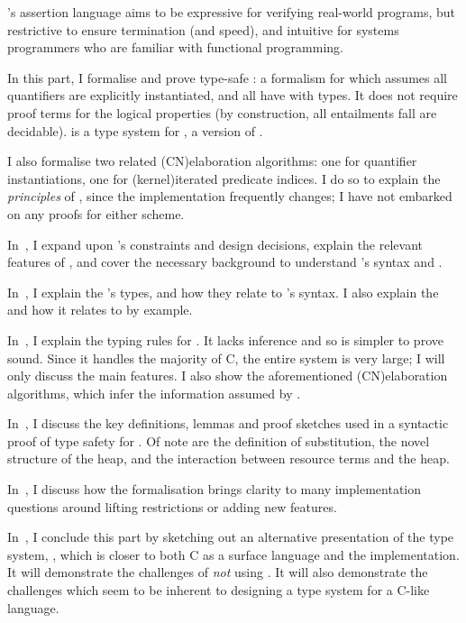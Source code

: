 's assertion language aims to be expressive for verifying real-world
programs, but restrictive to ensure termination (and speed), and intuitive for
systems programmers who are familiar with functional programming.

In this part, I formalise and prove type-safe : a formalism for
 which assumes all quantifiers are explicitly instantiated, and all
 have  with  types. It does
not require proof terms for the logical properties (by construction, all
entailments fall are decidable).  is a  type
system for , a  version of .

I also formalise two related \kl(CN){elaboration} algorithms: one for quantifier
instantiations, one for \kl(kernel){iterated} predicate indices. I do so to explain the
\emph{principles} of , since the implementation
frequently changes; I have not embarked on any proofs for either scheme.

In~, I expand upon 's constraints and
design decisions, explain the relevant features of , and cover the
necessary background to understand 's syntax and .

In~, I explain the 's types, and
how they relate to 's syntax. I also explain the  and how it
relates to  by example.

In~, I explain the  typing rules
for . It lacks inference and so is simpler to prove sound. Since it
handles the majority of C, the entire system is very large; I will only discuss
the main features. I also show the aforementioned \kl(CN){elaboration} algorithms, which
infer the information assumed by .

In~, I discuss the key definitions, lemmas and
proof sketches used in a syntactic proof of type safety for . Of
note are the definition of substitution, the novel structure of the heap, and
the interaction between resource terms and the heap.

In~, I discuss how the formalisation brings clarity
to many implementation questions around lifting restrictions or adding new
features.

In~, I conclude this part by sketching out an
alternative presentation of the  type system, , which is
closer to both C as a surface language and the  implementation. It will
demonstrate the challenges of \emph{not} using . It will also
demonstrate the challenges which seem to be inherent to designing a type system
for a C-like language.

